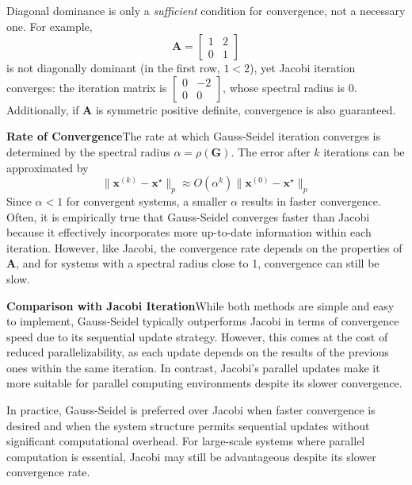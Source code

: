 Diagonal dominance is only a \emph{sufficient} condition for convergence, not a necessary one.
For example,
\begin{equation*}
    \mathbf{A} = \begin{bmatrix} 1 & 2 \\ 0 & 1 \end{bmatrix}
\end{equation*}
is not diagonally dominant (in the first row, $1 < 2$), yet Jacobi iteration converges: the iteration matrix is $\begin{bmatrix} 0 & -2 \\ 0 & 0 \end{bmatrix}$, whose spectral radius is $0$. Additionally, if $\mathbf{A}$ is symmetric positive definite, convergence is also guaranteed.

\textbf{Rate of Convergence}\quad The rate at which Gauss-Seidel iteration converges is determined by the spectral radius $\alpha = \rho(\mathbf{G})$. The error after $k$ iterations can be approximated by
\begin{equation*}
    \|\mathbf{x}^{(k)} - \mathbf{x}^\star\|_p \approx O(\alpha^k) \|\mathbf{x}^{(0)} - \mathbf{x}^\star\|_p
\end{equation*}
Since $\alpha < 1$ for convergent systems, a smaller $\alpha$ results in faster convergence. Often, it is empirically true that Gauss-Seidel converges faster than Jacobi because it effectively incorporates more up-to-date information within each iteration. However, like Jacobi, the convergence rate depends on the properties of $\mathbf{A}$, and for systems with a spectral radius close to 1, convergence can still be slow.

\textbf{Comparison with Jacobi Iteration}\quad While both methods are simple and easy to implement, Gauss-Seidel typically outperforms Jacobi in terms of convergence speed due to its sequential update strategy. However, this comes at the cost of reduced parallelizability, as each update depends on the results of the previous ones within the same iteration. In contrast, Jacobi's parallel updates make it more suitable for parallel computing environments despite its slower convergence.

In practice, Gauss-Seidel is preferred over Jacobi when faster convergence is desired and when the system structure permits sequential updates without significant computational overhead. For large-scale systems where parallel computation is essential, Jacobi may still be advantageous despite its slower convergence rate.

